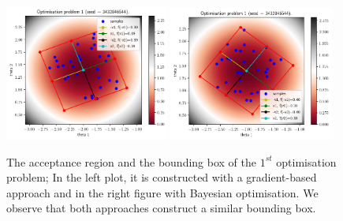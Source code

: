 \begin{figure}[ht]
    \begin{center}
      \includegraphics[width=0.48\textwidth]{./Thesis/images/chapter4/ex2D_region_1.png}
      \includegraphics[width=0.48\textwidth]{./Thesis/images/chapter4/ex2D_region_1_bo.png}
    \end{center}
    \caption[2D example, the bounding box of the $1^{st}$ optimisation problem.]{The acceptance region and the bounding box of the
      $1^{st}$ optimisation problem; In the left plot, it is
      constructed with a gradient-based approach and in the right
      figure with Bayesian optimisation. We observe that both
      approaches construct a similar bounding box.}
  \label{fig:ex2_2}
\end{figure}


